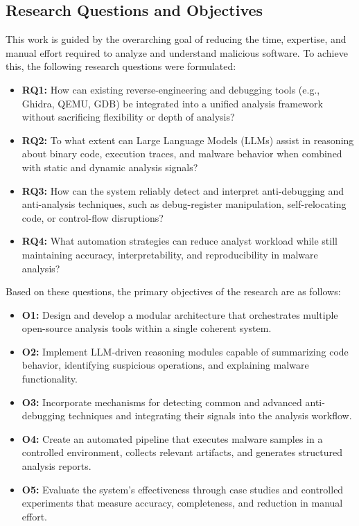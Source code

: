 \documentclass[conference]{IEEEtran}
\begin{document}
\subsection{Research Questions and Objectives}
This work is guided by the overarching goal of reducing the time, expertise, and manual effort required to analyze and understand malicious software. To achieve this, the following research questions were formulated:

\begin{itemize}
    \item \textbf{RQ1:} How can existing reverse-engineering and debugging tools (e.g., Ghidra, QEMU, GDB) be integrated into a unified analysis framework without sacrificing flexibility or depth of analysis?
    \item \textbf{RQ2:} To what extent can Large Language Models (LLMs) assist in reasoning about binary code, execution traces, and malware behavior when combined with static and dynamic analysis signals?
    \item \textbf{RQ3:} How can the system reliably detect and interpret anti-debugging and anti-analysis techniques, such as debug-register manipulation, self-relocating code, or control-flow disruptions?
    \item \textbf{RQ4:} What automation strategies can reduce analyst workload while still maintaining accuracy, interpretability, and reproducibility in malware analysis?
\end{itemize}

Based on these questions, the primary objectives of the research are as follows:

\begin{itemize}
    \item \textbf{O1:} Design and develop a modular architecture that orchestrates multiple open-source analysis tools within a single coherent system.
    \item \textbf{O2:} Implement LLM-driven reasoning modules capable of summarizing code behavior, identifying suspicious operations, and explaining malware functionality.
    \item \textbf{O3:} Incorporate mechanisms for detecting common and advanced anti-debugging techniques and integrating their signals into the analysis workflow.
    \item \textbf{O4:} Create an automated pipeline that executes malware samples in a controlled environment, collects relevant artifacts, and generates structured analysis reports.
    \item \textbf{O5:} Evaluate the system's effectiveness through case studies and controlled experiments that measure accuracy, completeness, and reduction in manual effort.
\end{itemize}
\end{document}
